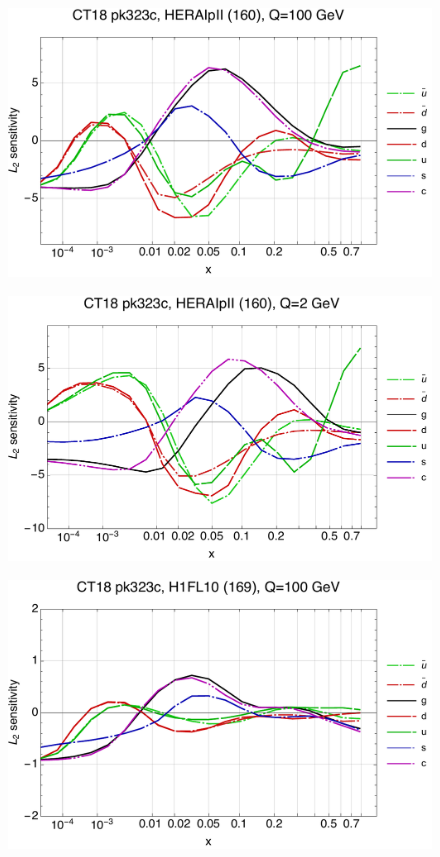 \documentclass[10pt,aps,prd,floatfix,titlepage]{revtex4}
\begin{document}
\clearpage
\begin{figure}
\includegraphics[width=\textwidth,height=0.44\textheight,keepaspectratio]{1/160_ct18nn_L2_q100_Sf_1.pdf}
\caption{}
\end{figure}
\begin{figure}
\includegraphics[width=\textwidth,height=0.44\textheight,keepaspectratio]{1/160_ct18nn_L2_q2_Sf_1.pdf}
\caption{}
\end{figure}
\clearpage
\begin{figure}
\includegraphics[width=\textwidth,height=0.44\textheight,keepaspectratio]{1/169_ct18nn_L2_q100_Sf_1.pdf}
\caption{}
\end{figure}
\end{document}
